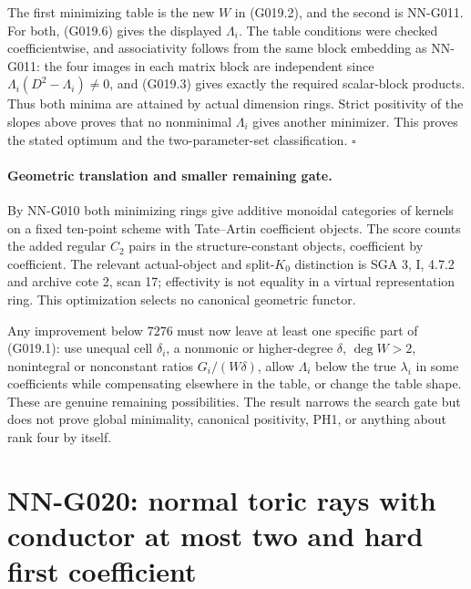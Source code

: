 The first minimizing table is the new $W$ in (G019.2),
and the second is NN-G011. For both, (G019.6) gives the
displayed $\Lambda_i$. The table conditions were checked
coefficientwise, and associativity follows from the same
block embedding as NN-G011: the four images in each matrix
block are independent since $\Lambda_i(D^2-\Lambda_i)\ne0$,
and (G019.3) gives exactly the required scalar-block products.
Thus both minima are attained by actual dimension rings.
Strict positivity of the slopes above proves that no
nonminimal $\Lambda_i$ gives another minimizer. This proves
the stated optimum and the two-parameter-set classification.
\hfill$\square$

\paragraph{Geometric translation and smaller remaining gate.}
By NN-G010 both minimizing rings give additive monoidal
categories of kernels on a fixed ten-point scheme with
Tate--Artin coefficient objects. The score counts the added
regular $C_2$ pairs in the structure-constant objects,
coefficient by coefficient. The relevant actual-object and
split-$K_0$ distinction is SGA 3, I, 4.7.2 and archive cote 2,
scan 17; effectivity is not equality in a virtual representation
ring. This optimization selects no canonical geometric functor.

Any improvement below $7276$ must now leave at least one
specific part of (G019.1): use unequal cell $\delta_i$,
a nonmonic or higher-degree $\delta$, $\deg W>2$,
nonintegral or nonconstant ratios $G_i/(W\delta)$,
allow $\Lambda_i$ below the true $\lambda_i$ in some
coefficients while compensating elsewhere in the table,
or change the table shape. These are genuine remaining
possibilities. The result narrows the search gate but
does not prove global minimality, canonical positivity,
PH1, or anything about rank four by itself.



\section{NN-G020: normal toric rays with conductor at most two and hard first coefficient}

